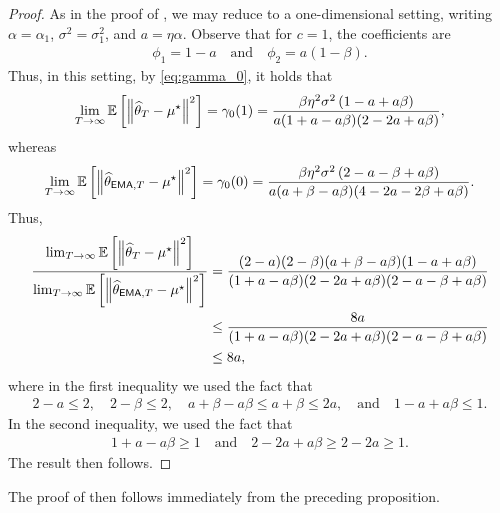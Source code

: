 \begin{proof}
    As in the proof of , we may reduce to a one-dimensional setting, writing $\alpha = \alpha_1$, $\sigma^2 = \sigma_1^2$, and $a = \eta \alpha$.  Observe that for $c = 1$, the coefficients are
    \begin{align}
        \phi_1 = 1 - a \quad \text{and} \quad \phi_2 = a (1 - \beta).
    \end{align}
    Thus, in this setting, by \eqref{eq:gamma_0}, it holds that
    \begin{align}
        \lim_{T \to \infty}\ee\left[ \norm{\thetahat_T - \mustar}^2 \right] = \gamma_0(1) = \frac{\beta \eta^2 \sigma^2 \left( 1 - a + a \beta \right)}{a (1 + a - a \beta)(2 - 2a + a \beta)},
    \end{align}
    whereas
    \begin{align}
        \lim_{T \to \infty} \ee\left[ \norm{\thetema[T] - \mustar}^2 \right] = \gamma_0(0) = \frac{\beta \eta^2 \sigma^2\left( 2 - a - \beta + a\beta \right)}{a(a + \beta - a \beta)(4 - 2a - 2\beta + a \beta)}.
    \end{align}
    Thus,
    \begin{align}
        \frac{\lim_{T \to \infty}\ee\left[ \norm{\thetahat_T - \mustar}^2 \right]}{\lim_{T \to \infty} \ee\left[ \norm{\thetema[T] - \mustar}^2 \right]} &= \frac{(2 - a)(2 - \beta)(a + \beta - a \beta)(1 - a + a \beta)}{(1  + a - a \beta)(2 - 2 a + a \beta)(2 - a - \beta + a \beta)} \\
        &\leq \frac{8 a}{(1  + a - a \beta)(2 - 2 a + a \beta)(2 - a - \beta + a \beta)} \\
        &\leq 8 a,
    \end{align}
    where in the first inequality we used the fact that
    \begin{align}
        2 -a \leq 2, \quad 2 - \beta \leq 2, \quad a + \beta - a \beta \leq a + \beta \leq 2 a, \quad \text{and} \quad 1 - a + a \beta \leq 1.
    \end{align}
    In the second inequality, we used the fact that
    \begin{align}
        1 + a - a \beta \geq 1 \quad \text{and} \quad 2 - 2a + a \beta \geq 2 - 2 a \geq 1.
    \end{align}
    The result then follows.
\end{proof}

The proof of  then follows immediately from the preceding proposition.



